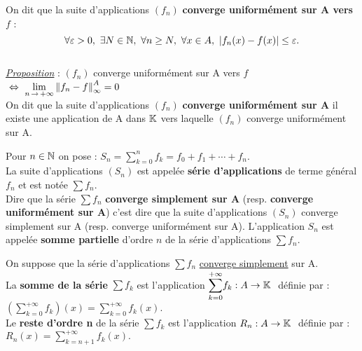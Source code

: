 \vspace{2cm}

\noindent On dit que la suite d'applications \((f_n)\) \textbf{converge uniformément sur A vers \(f\)} \ssi :\vspace{-0.2cm} \[ \forall \varepsilon>0,\ \exists N\in \mathbb{N},\ \forall n\geq N,\ \forall x\in A,\ |f_n(x)-f(x)|\leq \varepsilon. \]\\
\underline{\emph{Proposition}} : $(f_n)$ converge uniformément sur A vers $f$ \(\ \Leftrightarrow \ \displaystyle \lim_{n\,\to\,+\infty} \left\lVert f_n-f\right\rVert_\infty^A=0\)\vspace{0.7cm}\\
On dit que la suite d'applications \((f_n)\) \textbf{converge uniformément sur A} \ssi il existe une application de A dans \(\mathbb{K}\) vers laquelle \((f_n)\) converge uniformément sur A.

\vspace{1.5cm}

Pour \(n\in \mathbb{N}\) on pose : \(\displaystyle S_n = \sum_{k=0}^{n}f_k=f_0+f_1+\cdots+f_n \).\\
La suite d'applications \(\left(S_n\right)\) est appelée \textbf{série d'applications} de terme général \(f_n\) et est notée \(\sum f_n\).\\
Dire que la série \(\sum f_n\) \textbf{converge simplement sur A} (resp. \textbf{converge uniformément sur A}) c'est dire que la suite d'applications \(\left(S_n\right)\) converge simplement sur A (resp. converge uniformément sur A). L'application \(S_n\) est appelée \textbf{somme partielle} d'ordre $n$ de la série d'applications \(\sum f_n\).

\vspace{2cm}

On suppose que la série d'applications \(\sum f_n\) \underline{converge simplement} sur A.\vspace{0.1cm}\\
La \textbf{somme de la série} \(\sum f_k\) est l'application \(\displaystyle \sum_{k=0}^{+\infty}\! f_k : A\to \mathbb{K} \ \) définie par : \(\displaystyle \left(\sum_{k=0}^{+\infty}f_k \right)(x)=\sum_{k=0}^{+\infty}f_k(x). \)\vspace{0.2cm}\\
Le \textbf{reste d'ordre n} de la série \(\sum f_k\) est l'application \(R_n : A\to \mathbb{K} \ \) définie par : \(\displaystyle R_n(x) = \sum_{k=n+1}^{+\infty}f_k(x). \)

